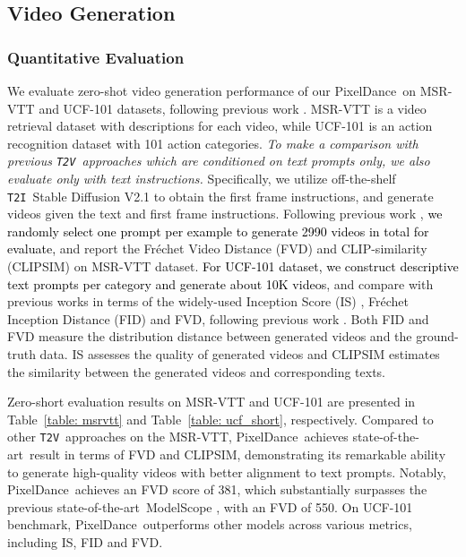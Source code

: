 \documentclass[10pt,twocolumn,letterpaper]{article}
\newcommand{\tcb}{\textcolor{black}}
\newcommand{\sota}{{state-of-the-art}}
\newcommand{\tv}{{\texttt{T2V}}}
\newcommand{\ti}{{\texttt{T2I}}}
\newcommand{\ours}{{PixelDance}}
\begin{document}
\subsection{Video Generation}
\label{sec: exp_short}


\subsubsection{Quantitative Evaluation}
\label{sec: quant_eva}

We evaluate zero-shot video generation performance of our \ours~on MSR-VTT \cite{xu2016msr-vtt} and UCF-101 \cite{soomro2012UCF} datasets, following previous work \cite{hong2022cogvideo,zhou2022magicvideo,he2022LVDM,blattmann2023alignVideo-LDM}. MSR-VTT is a video retrieval dataset with descriptions for each video, while UCF-101 is an action recognition dataset with 101 action categories.
\textit{To make a comparison with previous \tv~approaches which are conditioned on text prompts only, we also evaluate only with text instructions.} Specifically, we utilize off-the-shelf \ti~Stable Diffusion V2.1 \cite{rombach2022high} to obtain the first frame instructions, and generate videos given the text and first frame instructions. Following previous work \cite{wang2023videofactory,fei2023DysenVDM}, \tcb{we randomly select one prompt per example to generate 2990 videos in total for evaluate,} and report the Fr\'echet Video Distance (FVD) \cite{unterthiner2018FVD} and CLIP-similarity (CLIPSIM) \cite{wu2021CLIPSIM} on MSR-VTT dataset. \tcb{For UCF-101 dataset, we construct descriptive text prompts per category and generate about 10K videos}, and compare with previous works in terms of the widely-used Inception Score (IS) \cite{saito2020IS},  Fr\'echet Inception Distance (FID) \cite{heusel2017FID} and FVD, following previous work \cite{wang2023videofactory,fei2023DysenVDM}. Both FID and FVD measure the distribution distance between generated videos and the ground-truth data. IS assesses the quality of generated videos and CLIPSIM estimates the similarity between the generated videos and corresponding texts.



Zero-short evaluation results on MSR-VTT and UCF-101 are presented in Table~\ref{table: msrvtt} and Table~\ref{table: ucf_short}, respectively. Compared to other \tv~approaches on the MSR-VTT, \ours~achieves \sota~result in terms of FVD and CLIPSIM, demonstrating its remarkable ability to generate high-quality videos with better alignment to text prompts. Notably, \ours~achieves an FVD score of 381, which substantially surpasses the previous \sota~ModelScope \cite{wang2023modelscope}, with an FVD of 550. On UCF-101 benchmark, \ours~outperforms other models across various metrics, including IS, FID and FVD.  
\end{document}
